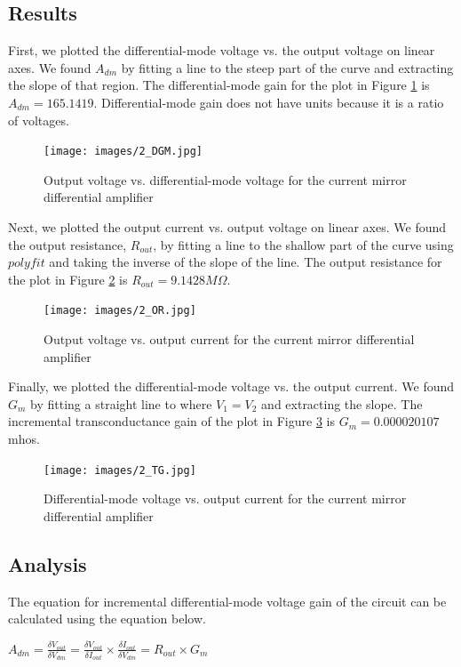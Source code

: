 \documentclass{article}
\begin{document}
\subsection{Results}
First, we plotted the differential-mode voltage vs. the output voltage on linear axes.  We found $A_{dm}$ by fitting a line to the steep part of the curve and extracting the slope of that region.  The differential-mode gain for the plot in Figure \ref{fig:DGM} is $A_{dm} = 165.1419$.  Differential-mode gain does not have units because it is a ratio of voltages.

\begin{figure}[H]
  \begin{center}      
  \texttt{[image: images/2\_DGM.jpg]}
  \caption{Output voltage vs. differential-mode voltage for the current mirror differential amplifier}   
  \label{fig:DGM}
  \end{center}
\end{figure}

Next, we plotted the output current vs. output voltage on linear axes.  We found the output resistance, $R_{out}$, by fitting a line to the shallow part of the curve using $polyfit$ and taking the inverse of the slope of the line.  The output resistance for the plot in Figure \ref{fig:OR} is $R_{out} = 9.1428 M \Omega$.

\begin{figure}[H]
  \begin{center}      
  \texttt{[image: images/2\_OR.jpg]}
  \caption{Output voltage vs. output current for the current mirror differential amplifier}   
  \label{fig:OR}
  \end{center}
\end{figure}

Finally, we plotted the differential-mode voltage vs. the output current.  We found $G_{m}$ by fitting a straight line to where $V_{1} = V_{2}$ and extracting the slope.  The incremental transconductance gain of the plot in Figure \ref{fig:TG} is $G_{m} = 0.000020107$ mhos.

\begin{figure}[H]
  \begin{center}      
  \texttt{[image: images/2\_TG.jpg]}
  \caption{Differential-mode voltage vs. output current for the current mirror differential amplifier}   
  \label{fig:TG}
  \end{center}
\end{figure}
\subsection{Analysis}
The equation for incremental differential-mode voltage gain of the circuit can be calculated using the equation below.
\begin{center}
 $A_{dm} = \frac{\delta V_{out}}{\delta V_{dm}} = \frac{\delta V_{out}}{\delta I_{out}} \times \frac{\delta I_{out}}{\delta V_{dm}} = R_{out} \times G_{m}$
   \end{center}
   
\end{document}
